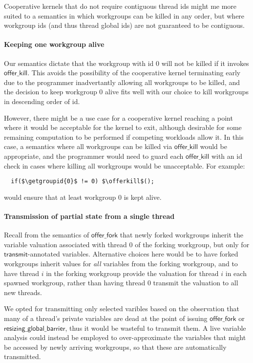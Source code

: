 \documentclass[numbers,nocopyrightspace,10pt]{sigplanconf}
\newcommand{\transmit}{\mathsf{transmit}}
\newcommand{\offerfork}{\mathsf{offer\_fork}}
\newcommand{\offerkill}{\mathsf{offer\_kill}}
\newcommand{\resizingglobalbarrier}{\mathsf{resizing\_global\_barrier}}
\newcommand{\getgroupid}{\mathsf{get\_group\_id}}
\begin{document}
Cooperative kernels that do not require contiguous thread ids might me
more suited to a semantics in which workgroups can be killed in any
order, but where workgroup ids (and thus thread global ids) are not
guaranteed to be contiguous.

\paragraph{Keeping one workgroup alive}

Our semantics dictate that the workgroup with id 0 will not be killed
if it invokes $\offerkill$.  This avoids the possibility of the
cooperative kernel terminating early due to the programmer
inadvertantly allowing all workgroups to be killed, and the decision
to keep workgroup 0 alive fits well with our choice to kill workgroups
in descending order of id.

However, there might be a use case for a cooperative kernel reaching a
point where it would be acceptable for the kernel to exit, although
desirable for some remaining computation to be performed if competing
workloads allow it.  In this case, a semantics where all workgroups can be killed via $\offerkill$ would be appropriate, and the programmer would need to guard each $\offerkill$ with an id check in cases where killing all workgroups would be unacceptable.  For example:
%
\lstset{basicstyle=\tt,numbers=none}
\begin{lstlisting}
  if($\getgroupid{0}$ != 0) $\offerkill$();
\end{lstlisting}
\lstset{basicstyle=\scriptsize\tt,numbers=left}
%
would ensure that at least workgroup 0 is kept alive.

\paragraph{Transmission of partial state from a single thread}

Recall from the semantics of $\offerfork$ that newly forked workgroups
inherit the variable valuation associated with thread 0 of the forking
workgroup, but only for $\transmit$-annotated variables.  Alternative
choices here would be to have forked workgroups inherit values for
\emph{all} variables from the forking workgroup, and to have thread
$i$ in the forking workgroup provide the valuation for thread $i$ in
each spawned workgroup, rather than having thread 0 transmit the
valuation to all new threads.

We opted for transmitting only selected varibles based on the
observation that many of a thread's private variables are dead at the
point of issuing $\offerfork$ or $\resizingglobalbarrier$, thus it
would be wasteful to transmit them.  A live variable analysis could
instead be employed to over-approximate the variables that might be
accessed by newly arriving workgroups, so that these are automatically
transmitted.
\end{document}
